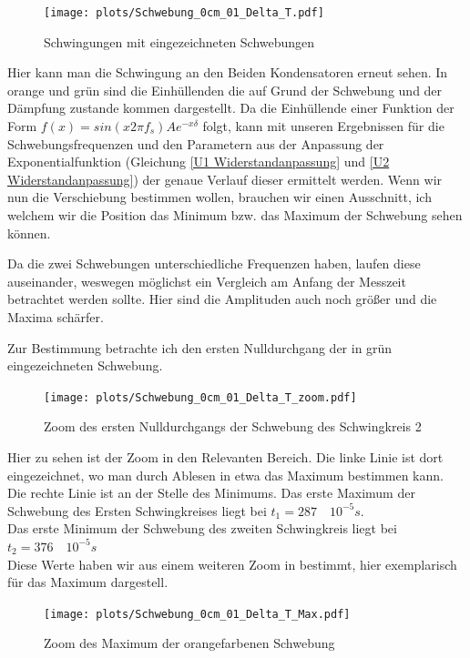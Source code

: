 \documentclass[twoside]{protokoll}
\begin{document}
\begin{figure}[H]
    \centering
    \texttt{[image: plots/Schwebung\_0cm\_01\_Delta\_T.pdf]}
    \caption{Schwingungen mit eingezeichneten Schwebungen}
\end{figure}

Hier kann man die Schwingung an den Beiden Kondensatoren erneut sehen. 
In orange und grün sind die Einhüllenden die auf Grund der Schwebung und der Dämpfung zustande kommen dargestellt. 
Da die Einhüllende einer Funktion der Form $ f(x) = sin\left(x2\pi f_s\right)Ae^{-x\delta}$ folgt, kann mit unseren Ergebnissen für die Schwebungsfrequenzen und den Parametern aus der Anpassung der Exponentialfunktion (Gleichung \ref{U1 Widerstandanpassung} und \ref{U2 Widerstandanpassung}) der genaue Verlauf dieser ermittelt werden.
Wenn wir nun die Verschiebung bestimmen wollen, brauchen wir einen Ausschnitt, ich welchem wir die Position das Minimum bzw. das Maximum der Schwebung sehen können. 

Da die zwei Schwebungen unterschiedliche Frequenzen haben, laufen diese auseinander, weswegen möglichst ein Vergleich am Anfang der Messzeit betrachtet werden sollte.
Hier sind die Amplituden auch noch größer und die Maxima schärfer.

Zur Bestimmung betrachte ich den ersten Nulldurchgang der in grün eingezeichneten Schwebung. 

\begin{figure}[H]
    \centering
    \texttt{[image: plots/Schwebung\_0cm\_01\_Delta\_T\_zoom.pdf]}
    \caption{Zoom des ersten Nulldurchgangs der Schwebung des Schwingkreis 2}
\end{figure}

Hier zu sehen ist der Zoom in den Relevanten Bereich. Die linke Linie ist dort eingezeichnet, wo man durch Ablesen in etwa das Maximum bestimmen kann. Die rechte Linie ist an der Stelle des Minimums. Das erste Maximum der Schwebung des Ersten Schwingkreises liegt bei $ t_1 = 287 \quad 10^{-5}s$.\\
Das erste Minimum der Schwebung des zweiten Schwingkreis liegt bei $ t_2 = 376 \quad 10^{-5}s$\\
Diese Werte haben wir aus einem weiteren Zoom in bestimmt, hier exemplarisch für das Maximum dargestell.
\begin{figure}[H]
    \centering
    \texttt{[image: plots/Schwebung\_0cm\_01\_Delta\_T\_Max.pdf]}
    \caption{Zoom des Maximum der orangefarbenen Schwebung}
\end{figure}
\end{document}
